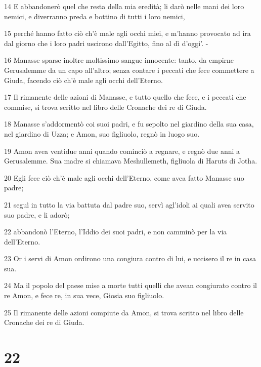 \par 14 E abbandonerò quel che resta della mia eredità; li darò nelle mani dei loro nemici, e diverranno preda e bottino di tutti i loro nemici,
\par 15 perché hanno fatto ciò ch'è male agli occhi miei, e m'hanno provocato ad ira dal giorno che i loro padri uscirono dall'Egitto, fino al dì d'oggi'. -
\par 16 Manasse sparse inoltre moltissimo sangue innocente: tanto, da empirne Gerusalemme da un capo all'altro; senza contare i peccati che fece commettere a Giuda, facendo ciò ch'è male agli occhi dell'Eterno.
\par 17 Il rimanente delle azioni di Manasse, e tutto quello che fece, e i peccati che commise, si trova scritto nel libro delle Cronache dei re di Giuda.
\par 18 Manasse s'addormentò coi suoi padri, e fu sepolto nel giardino della sua casa, nel giardino di Uzza; e Amon, suo figliuolo, regnò in luogo suo.
\par 19 Amon avea ventidue anni quando cominciò a regnare, e regnò due anni a Gerusalemme. Sua madre si chiamava Meshullemeth, figliuola di Haruts di Jotha.
\par 20 Egli fece ciò ch'è male agli occhi dell'Eterno, come avea fatto Manasse suo padre;
\par 21 seguì in tutto la via battuta dal padre suo, servì agl'idoli ai quali avea servito suo padre, e li adorò;
\par 22 abbandonò l'Eterno, l'Iddio dei suoi padri, e non camminò per la via dell'Eterno.
\par 23 Or i servi di Amon ordirono una congiura contro di lui, e uccisero il re in casa sua.
\par 24 Ma il popolo del paese mise a morte tutti quelli che avean congiurato contro il re Amon, e fece re, in sua vece, Giosia suo figliuolo.
\par 25 Il rimanente delle azioni compiute da Amon, si trova scritto nel libro delle Cronache dei re di Giuda.

\chapter{22}

